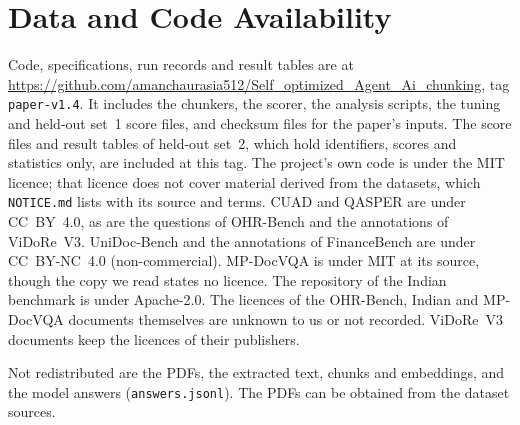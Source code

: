 \section*{Data and Code Availability}
Code, specifications, run records and result tables are at
\url{https://github.com/amanchaurasia512/Self_optimized_Agent_Ai_chunking}, tag
\texttt{paper-v1.4}. It includes the chunkers, the scorer, the analysis
scripts, the tuning and held-out set~1 score files, and
checksum files for the paper's inputs. The score files and result tables of
held-out set~2, which hold identifiers, scores and statistics only, are included
at this tag. The project's own code is under the MIT licence; that licence does not
cover material derived from the datasets, which \texttt{NOTICE.md} lists with its
source and terms. CUAD and QASPER are under CC~BY~4.0, as are the questions of
OHR-Bench and the annotations of ViDoRe~V3. UniDoc-Bench and the annotations of
FinanceBench are under CC~BY-NC~4.0 (non-commercial). MP-DocVQA is under MIT at
its source, though the copy we read states no licence. The repository of the
Indian benchmark is under Apache-2.0. The licences of the OHR-Bench, Indian
and MP-DocVQA documents themselves are unknown to us or not recorded.
ViDoRe~V3 documents keep the licences of their publishers.

Not redistributed are the PDFs, the extracted text, chunks and embeddings, and
the model answers (\texttt{answers.jsonl}). The PDFs can be
obtained from the dataset sources.
